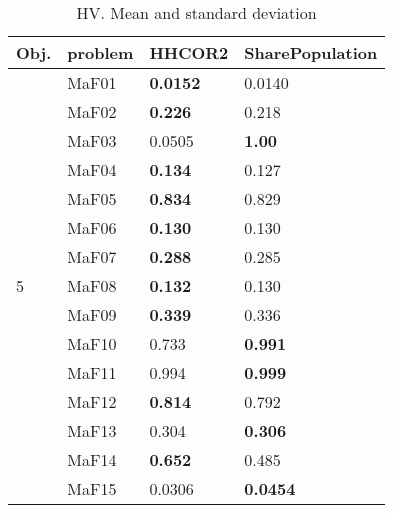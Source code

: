 \documentclass[]{article}
\begin{document}
\begin{table}
\caption{HV. Mean and standard deviation}
\label{table:mean.HV}
\centering
\begin{footnotesize}
\begin{tabular}{|l|l|l|l|}
\hline
Obj. & problem  & HHCOR2 & SharePopulation \\ \hline

\multirow{15}{*}{5} & MaF01 & \cellcolor{gray95} {\bf 0.0152} & 0.0140\\
 & MaF02 & \cellcolor{gray95} {\bf 0.226} & 0.218\\
 & MaF03 & 0.0505 & \cellcolor{gray95} {\bf 1.00}\\
 & MaF04 & \cellcolor{gray95} {\bf 0.134} & 0.127\\
 & MaF05 & \cellcolor{gray95} {\bf 0.834} & 0.829\\
 & MaF06 & \cellcolor{gray95} {\bf 0.130} & \cellcolor{gray95} 0.130\\
 & MaF07 & \cellcolor{gray95} {\bf 0.288} & 0.285\\
 & MaF08 & \cellcolor{gray95} {\bf 0.132} & 0.130\\
 & MaF09 & \cellcolor{gray95} {\bf 0.339} & 0.336\\
 & MaF10 & 0.733 & \cellcolor{gray95} {\bf 0.991}\\
 & MaF11 & 0.994 & \cellcolor{gray95} {\bf 0.999}\\
 & MaF12 & \cellcolor{gray95} {\bf 0.814} & 0.792\\
 & MaF13 & \cellcolor{gray95} 0.304 & \cellcolor{gray95} {\bf 0.306}\\
 & MaF14 & \cellcolor{gray95} {\bf 0.652} & 0.485\\
 & MaF15 & 0.0306 & \cellcolor{gray95} {\bf 0.0454}\\
\hline


\end{tabular}
\end{footnotesize}
\end{table}
\end{document}
